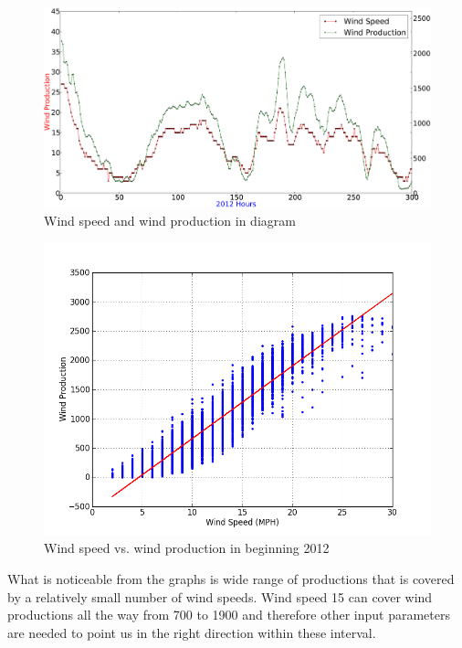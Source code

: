 \begin{figure}[H]
\centering
\includegraphics[width=0.99\linewidth,natwidth=898,natheight=587]{billeder/windSpeedWindProductionPlot.png}
\caption{Wind speed and wind production in diagram}
\label{fig:windSpeedWindProductionPlot}
\end{figure}

\begin{figure}[H]
\centering
\includegraphics[width=0.99\linewidth,natwidth=898,natheight=587]{billeder/WindSpeedVsProduction.png}
\caption{Wind speed vs. wind production in beginning 2012}
\label{fig:windVsProd}
\end{figure}

What is noticeable from the graphs is wide range of productions that is covered by a relatively small number of wind speeds. Wind speed 15 can cover wind productions all the way from 700 to 1900 and therefore other input parameters are needed to point us in the right direction within these interval. 

